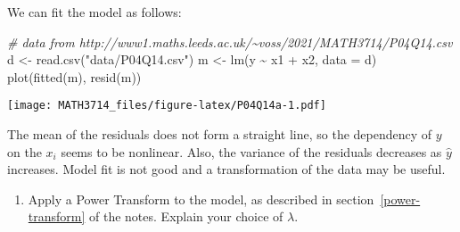 \documentclass[
  a4paper,
]{article}
\newenvironment{Shaded}{\begin{snugshade}}{\end{snugshade}}
\newcommand{\AttributeTok}[1]{\textcolor[rgb]{0.77,0.63,0.00}{#1}}
\newcommand{\CommentTok}[1]{\textcolor[rgb]{0.56,0.35,0.01}{\textit{#1}}}
\newcommand{\FunctionTok}[1]{\textcolor[rgb]{0.00,0.00,0.00}{#1}}
\newcommand{\NormalTok}[1]{#1}
\newcommand{\OtherTok}[1]{\textcolor[rgb]{0.56,0.35,0.01}{#1}}
\newcommand{\SpecialCharTok}[1]{\textcolor[rgb]{0.00,0.00,0.00}{#1}}
\newcommand{\StringTok}[1]{\textcolor[rgb]{0.31,0.60,0.02}{#1}}
\providecommand{\tightlist}{%
  \setlength{\itemsep}{0pt}\setlength{\parskip}{0pt}}
\theoremstyle{definition}
\theoremstyle{definition}
\theoremstyle{definition}
\theoremstyle{definition}
\theoremstyle{remark}
\begin{document}
\begin{myanswers}
We can fit the model as follows:

\begin{Shaded}
\begin{Highlighting}[]
\CommentTok{\# data from http://www1.maths.leeds.ac.uk/\textasciitilde{}voss/2021/MATH3714/P04Q14.csv}
\NormalTok{d }\OtherTok{\textless{}{-}} \FunctionTok{read.csv}\NormalTok{(}\StringTok{"data/P04Q14.csv"}\NormalTok{)}
\NormalTok{m }\OtherTok{\textless{}{-}} \FunctionTok{lm}\NormalTok{(y }\SpecialCharTok{\textasciitilde{}}\NormalTok{ x1 }\SpecialCharTok{+}\NormalTok{ x2, }\AttributeTok{data =}\NormalTok{ d)}
\FunctionTok{plot}\NormalTok{(}\FunctionTok{fitted}\NormalTok{(m), }\FunctionTok{resid}\NormalTok{(m))}
\end{Highlighting}
\end{Shaded}

\texttt{[image: MATH3714\_files/figure-latex/P04Q14a-1.pdf]}

The mean of the residuals does not form a straight line, so the
dependency of \(y\) on the \(x_i\) seems to be nonlinear. Also, the variance
of the residuals decreases as \(\hat y\) increases. Model fit is not good
and a transformation of the data may be useful.

\end{myanswers}

\begin{enumerate}
\def\labelenumi{\alph{enumi}.}
\setcounter{enumi}{1}
\tightlist
\item
  Apply a Power Transform to the model, as described in
  section~\ref{power-transform} of the notes. Explain your choice of \(\lambda\).
\end{enumerate}
\end{document}

